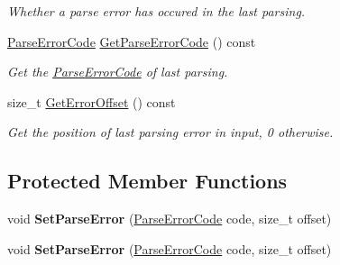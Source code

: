 \begin{DoxyCompactItemize}
\begin{DoxyCompactList}\small\item\em Whether a parse error has occured in the last parsing. \end{DoxyCompactList}\item 
\hyperlink{group___r_a_p_i_d_j_s_o_n___e_r_r_o_r_s_ga8d4b32dfc45840bca189ade2bbcb6ba7}{Parse\+Error\+Code} \hyperlink{class_generic_reader_ac45a26246877c4daa85021ae67caa017}{Get\+Parse\+Error\+Code} () const \hypertarget{class_generic_reader_ac45a26246877c4daa85021ae67caa017}{}\label{class_generic_reader_ac45a26246877c4daa85021ae67caa017}

\begin{DoxyCompactList}\small\item\em Get the \hyperlink{group___r_a_p_i_d_j_s_o_n___e_r_r_o_r_s_ga8d4b32dfc45840bca189ade2bbcb6ba7}{Parse\+Error\+Code} of last parsing. \end{DoxyCompactList}\item 
size\+\_\+t \hyperlink{class_generic_reader_a77399ac40cca1fb113a2d507f476b4e7}{Get\+Error\+Offset} () const \hypertarget{class_generic_reader_a77399ac40cca1fb113a2d507f476b4e7}{}\label{class_generic_reader_a77399ac40cca1fb113a2d507f476b4e7}

\begin{DoxyCompactList}\small\item\em Get the position of last parsing error in input, 0 otherwise. \end{DoxyCompactList}\end{DoxyCompactItemize}
\subsection*{Protected Member Functions}
\begin{DoxyCompactItemize}
\item 
void {\bfseries Set\+Parse\+Error} (\hyperlink{group___r_a_p_i_d_j_s_o_n___e_r_r_o_r_s_ga8d4b32dfc45840bca189ade2bbcb6ba7}{Parse\+Error\+Code} code, size\+\_\+t offset)\hypertarget{class_generic_reader_ae50079444295bf109730c3b708a818a6}{}\label{class_generic_reader_ae50079444295bf109730c3b708a818a6}

\item 
void {\bfseries Set\+Parse\+Error} (\hyperlink{group___r_a_p_i_d_j_s_o_n___e_r_r_o_r_s_ga8d4b32dfc45840bca189ade2bbcb6ba7}{Parse\+Error\+Code} code, size\+\_\+t offset)\hypertarget{class_generic_reader_ae50079444295bf109730c3b708a818a6}{}\label{class_generic_reader_ae50079444295bf109730c3b708a818a6}

\end{DoxyCompactItemize}


